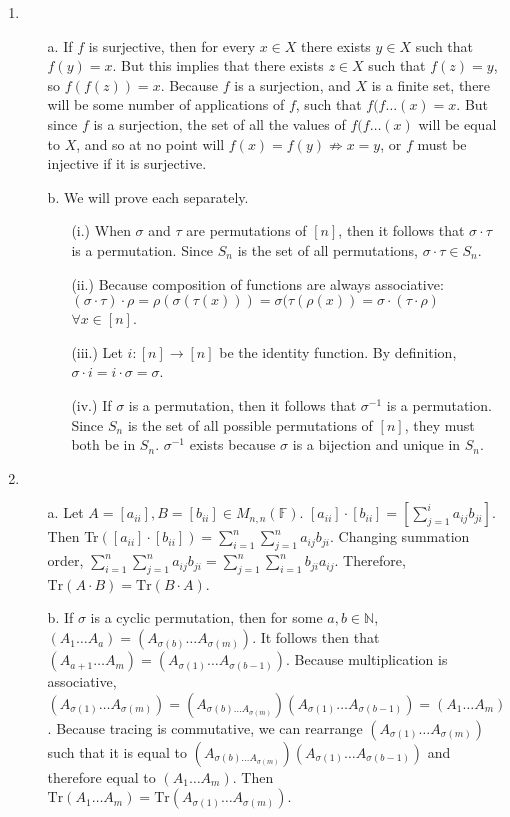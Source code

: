 \documentclass[10pt,english]{article}
\begin{document}
\begin{enumerate}
\pagebreak
\item \begin{enumerate}
\item [a.] If $f$ is surjective, then for every $x\in X$ there exists $y\in X$ such that $f(y)=x$. But this implies that there exists $z\in X$ such that $f(z)=y$, so $f(f(z))=x$. Because $f$ is a surjection, and $X$ is a finite set, there will be some number of applications of $f$, such that $f(f\ldots(x)=x$. But since $f$ is a surjection, the set of all the values of $f(f\ldots(x)$ will be equal to $X$, and so at no point will $f(x)=f(y)\not\Rightarrow x=y$, or $f$ must be injective if it is surjective. 
\item [b.] We will prove each separately. \begin{enumerate}
    \item [(i.)] When $\sigma$ and $\tau$ are permutations of $[n]$, then it follows that $\sigma\cdot\tau$ is a permutation. Since $S_n$ is the set of all permutations, $\sigma\cdot\tau\in S_n$. 
    \item [(ii.)] Because composition of functions are always associative: $(\sigma\cdot\tau)\cdot\rho=\rho(\sigma(\tau(x)))=\sigma(\tau(\rho(x))=\sigma\cdot(\tau\cdot\rho)$ $\forall x\in[n]$. 
    \item [(iii.)] Let $i:[n]\rightarrow[n]$ be the identity function. By definition, $\sigma\cdot i=i\cdot\sigma=\sigma$. 
    \item [(iv.)] If $\sigma$ is a permutation, then it follows that $\sigma^{-1}$ is a permutation. Since $S_n$ is the set of all possible permutations of $[n]$, they must both be in $S_n$. $\sigma^{-1}$ exists because $\sigma$ is a bijection and unique in $S_n$. 
\end{enumerate}
\end{enumerate}

\pagebreak
\item \begin{enumerate}
\item [a.] Let $A=[a_{ii}],B=[b_{ii}]\in M_{n,n}(\mathbb{F})$. $[a_{ii}]\cdot[b_{ii}]=[\sum_{j=1}^ia_{ij}b_{ji}]$. Then Tr$([a_{ii}]\cdot[b_{ii}])=\sum_{i=1}^n\sum_{j=1}^na_{ij}b_{ji}$. Changing summation order, $\sum_{i=1}^n\sum_{j=1}^na_{ij}b_{ji}=\sum_{j=1}^n\sum_{i=1}^nb_{ji}a_{ij}$. Therefore, $\text{Tr}(A\cdot B)=\text{Tr}(B\cdot A)$. 

\item [b.] If $\sigma$ is a cyclic permutation, then for some $a,b\in\mathbb{N}$, $(A_1\ldots A_a)=(A_{\sigma(b)}\ldots A_{\sigma(m)})$. It follows then that $(A_{a+1}\ldots A_m)=(A_{\sigma(1)}\ldots A_{\sigma(b-1)})$. Because multiplication is associative, $(A_{\sigma(1)}\ldots A_{\sigma(m)})=(A_{\sigma(b)\ldots A_{\sigma(m)}})(A_{\sigma(1)}\ldots A_{\sigma(b-1)})=(A_1\ldots A_m)$. Because tracing is commutative, we can rearrange $(A_{\sigma(1)}\ldots A_{\sigma(m)})$ such that it is equal to $(A_{\sigma(b)\ldots A_{\sigma(m)}})(A_{\sigma(1)}\ldots A_{\sigma(b-1)})$ and therefore equal to $(A_1\ldots A_m)$. Then $\text{Tr}(A_1\ldots A_m)=\text{Tr}(A_{\sigma(1)}\ldots A_{\sigma(m)})$.


\end{enumerate}
\end{enumerate}
\end{document}
